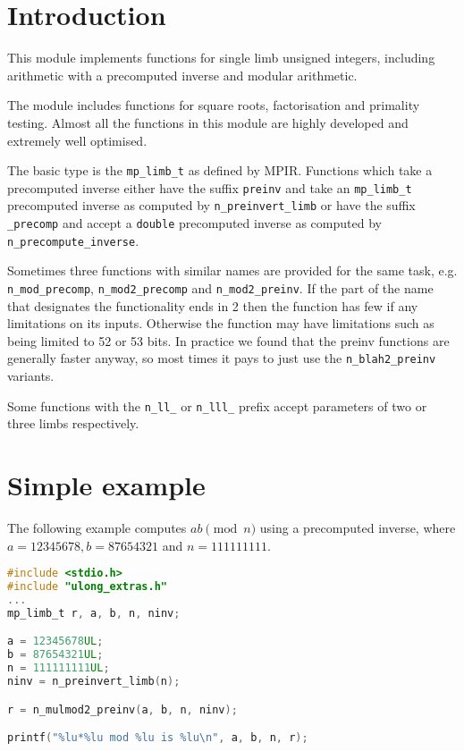 \documentclass[a4paper,10pt]{book}
\newcommand{\code}{\lstinline}
\begin{document}
\section{Introduction}

This module implements functions for single limb unsigned integers, 
including arithmetic with a precomputed inverse and modular arithmetic.

The module includes functions for square roots, factorisation and 
primality testing. Almost all the functions in this module are highly
developed and extremely well optimised.

The basic type is the \code{mp_limb_t} as defined by MPIR. Functions
which take a precomputed inverse either have the suffix \code{preinv} 
and take an \code{mp_limb_t} precomputed inverse as computed by 
\code{n_preinvert_limb} or have the suffix \code{_precomp} and accept
a \code{double} precomputed inverse as computed by 
\code{n_precompute_inverse}. 

Sometimes three functions with similar names are provided for the 
same task, e.g. \code{n_mod_precomp}, \code{n_mod2_precomp} and
\code{n_mod2_preinv}. If the part of the name that designates the
functionality ends in 2 then the function has few if any limitations 
on its inputs. Otherwise the function may have limitations such as
being limited to 52 or 53 bits. In practice we found that the 
preinv functions are generally faster anyway, so most times it pays
to just use the \code{n_blah2_preinv} variants.

Some functions with the \code{n_ll_} or \code{n_lll_} prefix accept
parameters of two or three limbs respectively.

\section{Simple example}

The following example computes $ab \pmod{n}$ using a precomputed 
inverse, where $a = 12345678, b = 87654321$ and $n = 111111111$.

\begin{lstlisting}[language=c]
#include <stdio.h>
#include "ulong_extras.h"
...
mp_limb_t r, a, b, n, ninv;

a = 12345678UL;
b = 87654321UL;
n = 111111111UL;
ninv = n_preinvert_limb(n);

r = n_mulmod2_preinv(a, b, n, ninv);

printf("%lu*%lu mod %lu is %lu\n", a, b, n, r);
\end{lstlisting}
\end{document}
